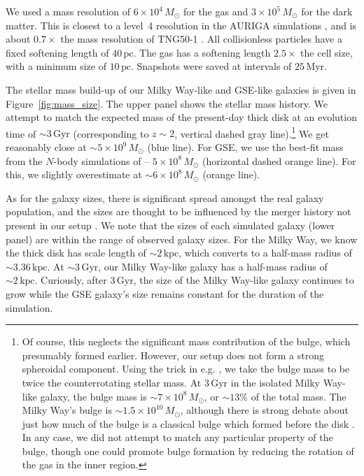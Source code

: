 \documentclass[twocolumn,linenumbers,trackchanges]{aastex631}
\newcommand{\Msun}{\ensuremath{M_{\odot}}}
\newcommand{\Gyr}{\ensuremath{\textrm{Gyr}}}
\newcommand{\Myr}{\ensuremath{\textrm{Myr}}}
\newcommand{\kpc}{\ensuremath{\textrm{kpc}}}
\newcommand{\pc}{\ensuremath{\textrm{pc}}}
\begin{document}
We used a mass resolution of $6\times10^4\,\Msun$ for the gas and $3\times10^5\,\Msun$ for the dark matter. This is closest to a level~4 resolution in the AURIGA simulations \citep{2017MNRAS.467..179G}, and is about $0.7\times$ the mass resolution of TNG50-1 \citep{2019MNRAS.490.3234N,2019MNRAS.490.3196P}. All collisionless particles have a fixed softening length of $40\,\pc$. The gas has a softening length $2.5\times$ the cell size, with a minimum size of $10\,\pc$. Snapshots were saved at intervals of $25\,\Myr$.

The stellar mass build-up of our Milky Way-like and GSE-like galaxies is given in Figure~\ref{fig:mass_size}. The upper panel shows the stellar mass history. We attempt to match the expected mass of the present-day thick disk \citep[$\sim6\times10^9\,\Msun$, horizontal blue dashed line][]{2016ARA&A..54..529B} at an evolution time of $\sim3\,\Gyr$ (corresponding to $z\sim2$, vertical dashed gray line).\footnote{Of course, this neglects the significant mass contribution of the bulge, which presumably formed earlier. However, our setup does not form a strong spheroidal component. Using the trick in e.g. \citet{2022MNRAS.515.1524Z}, we take the bulge mass to be twice the counterrotating stellar mass. At $3\,\Gyr$ in the isolated Milky Way-like galaxy, the bulge mass is $\sim7\times10^{8}\,\Msun$, or $\sim13\%$ of the total mass. The Milky Way's bulge is  $\sim1.5\times10^{10}\,\Msun$, although there is strong debate about just how much of the bulge is a classical bulge which formed before the disk \citep{2016ARA&A..54..529B}. In any case, we did not attempt to match any particular property of the bulge, though one could promote bulge formation by reducing the rotation of the gas in the inner region.} We get reasonably close at $\sim5\times10^9\,\Msun$ (blue line). For GSE, we use the best-fit mass from the $N$-body simulations of \citet{2021ApJ...923...92N} -- $5\times10^8\,\Msun$ (horizontal dashed orange line). For this, we slightly overestimate at $\sim6\times10^8\,\Msun$ (orange line).

As for the galaxy sizes, there is significant spread amongst the real galaxy population, and the sizes are thought to be influenced by the merger history not present in our setup \citep[e.g.][]{2014ApJ...788...28V}. We note that the sizes of each simulated galaxy (lower panel) are within the range of observed galaxy sizes. For the Milky Way, we know the thick disk has scale length of $\sim2\,\kpc$, which converts to a half-mass radius of $\sim3.36\,\kpc$. At $\sim3\,\Gyr$, our Milky Way-like galaxy has a half-mass radius of $\sim2\,\kpc$. Curiously, after $3\,\Gyr$, the size of the Milky Way-like galaxy continues to grow while the GSE galaxy's size remains constant for the duration of the simulation.
\end{document}
